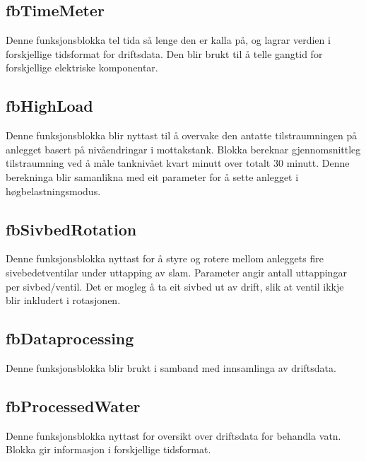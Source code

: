\subsection{fbTimeMeter}
Denne funksjonsblokka tel tida så lenge den er kalla på, og lagrar verdien i forskjellige tidsformat for driftsdata.
Den blir brukt til å telle gangtid for forskjellige elektriske komponentar.

\newpage

\subsection{fbHighLoad}
Denne funksjonsblokka blir nyttast til å overvake den antatte tilstraumningen på anlegget basert på nivåendringar i mottakstank.
Blokka bereknar gjennomsnittleg tilstraumning ved å måle tanknivået kvart minutt over totalt 30 minutt.
Denne berekninga blir samanlikna med eit parameter for å sette anlegget i høgbelastningsmodus.

\subsection{fbSivbedRotation}
Denne funksjonsblokka nyttast for å styre og rotere mellom anleggets fire sivebedetventilar under uttapping av slam. 
Parameter angir antall uttappingar per sivbed/ventil.
Det er mogleg å ta eit sivbed ut av drift, slik at ventil ikkje blir inkludert i rotasjonen.

\subsection{fbDataprocessing}
Denne funksjonsblokka blir brukt i samband med innsamlinga av driftsdata. 

\subsection{fbProcessedWater}
Denne funksjonsblokka nyttast for oversikt over driftsdata for behandla vatn. 
Blokka gir informasjon i forskjellige tidsformat.

\newpage

